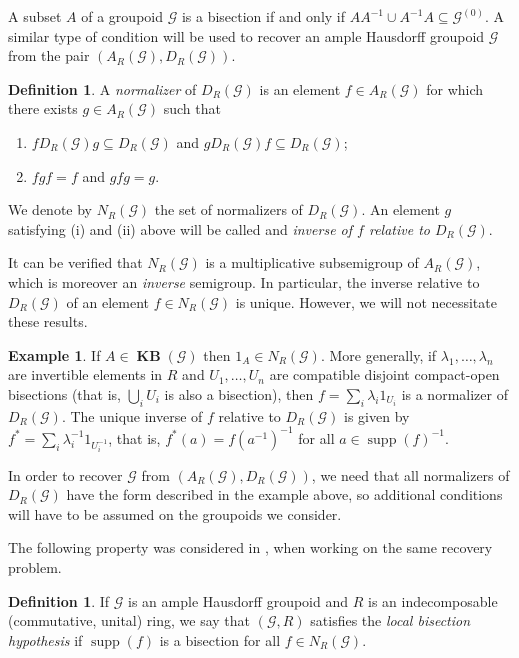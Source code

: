 \documentclass[letter,11pt]{amsart}
\theoremstyle{plain}		\newtheorem{theorem}[generalnumbering]{Theorem}
\theoremstyle{plain}		\newtheorem{corollary}[generalnumbering]{Corollary}
\theoremstyle{definition}		\newtheorem{definition}[generalnumbering]{Definition}
\theoremstyle{definition}		\newtheorem{example}[generalnumbering]{Example}
\theoremstyle{plain}		\newtheorem{proposition}[generalnumbering]{Proposition}
\theoremstyle{plain}		\newtheorem{lemma}[generalnumbering]{Lemma}
\theoremstyle{plain}    \newtheorem{plainstyle}[generalnumbering]{\namefordifferentenvironment}
\theoremstyle{plain}    \newtheorem*{plainstyle*}{\namefordifferentenvironment}
\theoremstyle{definition}    \newtheorem{definitionstyle}[generalnumbering]{\namefordifferentenvironment}
\theoremstyle{definition}    \newtheorem*{definitionstyle*}{\namefordifferentenvironment}
\DeclareMathOperator{\supp}{supp}
\DeclareMathOperator{\KB}{\mathbf{KB}}
\begin{document}
A subset $A$ of a groupoid $\mathcal{G}$ is a bisection if and only if $AA^{-1}\cup A^{-1}A\subseteq \mathcal{G}^{(0)}$. A similar type of condition will be used to recover an ample Hausdorff groupoid $\mathcal{G}$ from the pair $(A_R(\mathcal{G}),D_R(\mathcal{G}))$.

\begin{definition}
	A \emph{normalizer} of $D_R(\mathcal{G})$ is an element $f\in A_R(\mathcal{G})$ for which there exists $g\in A_R(\mathcal{G})$ such that
	\begin{enumerate}[label=(\roman*)]
		\item $fD_R(\mathcal{G})g\subseteq D_R(\mathcal{G})$ and $gD_R(\mathcal{G})f\subseteq D_R(\mathcal{G})$;
		\item $fgf=f$ and $gfg=g$.
	\end{enumerate}
	We denote by $N_R(\mathcal{G})$ the set of normalizers of $D_R(\mathcal{G})$. An element $g$ satisfying (i) and (ii) above will be called and \emph{inverse of $f$ relative to $D_R(\mathcal{G})$}.
\end{definition}

It can be verified that $N_R(\mathcal{G})$ is a multiplicative subsemigroup of $A_R(\mathcal{G})$, which is moreover an \emph{inverse} semigroup. In particular, the inverse relative to $D_R(\mathcal{G})$ of an element $f\in N_R(\mathcal{G})$ is unique. However, we will not necessitate these results.

\begin{example}
	If $A\in\KB(\mathcal{G})$ then $1_A\in N_R(\mathcal{G})$. More generally, if $\lambda_1,\ldots,\lambda_n$ are invertible elements in $R$ and $U_1,\ldots,U_n$ are compatible disjoint compact-open bisections (that is, $\bigcup_i U_i$ is also a bisection), then $f=\sum_i \lambda_i1_{U_i}$ is a normalizer of $D_R(\mathcal{G})$. The unique inverse of $f$ relative to $D_R(\mathcal{G})$ is given by $f^*=\sum_i\lambda_i^{-1}1_{U_i^{-1}}$, that is, $f^*(a)=f(a^{-1})^{-1}$ for all $a\in\supp(f)^{-1}$.
\end{example}

In order to recover $\mathcal{G}$ from $(A_R(\mathcal{G}),D_R(\mathcal{G}))$, we need that all normalizers of $D_R(\mathcal{G})$ have the form described in the example above, so additional conditions will have to be assumed on the groupoids we consider.

The following property was considered in \cite{arxiv1711.01903v2}, when working on the same recovery problem.

\begin{definition}\label{definitionlocalbisectionhypothesis}
	If $\mathcal{G}$ is an ample Hausdorff groupoid and $R$ is an indecomposable (commutative, unital) ring, we say that $(\mathcal{G},R)$ satisfies the \emph{local bisection hypothesis} if $\supp(f)$ is a bisection for all $f\in N_R(\mathcal{G})$.
\end{definition}
\end{document}
